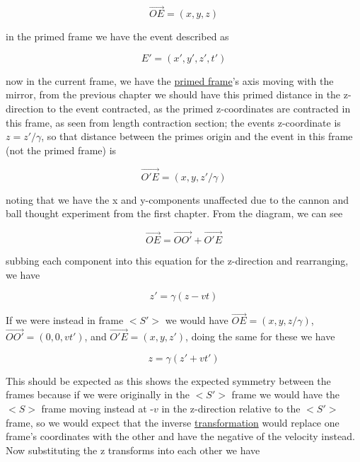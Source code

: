 \begin{equation}
	\vec{OE}=(x,y,z)
\end{equation}

in the primed frame we have the event described as

\begin{equation}
	E{'} = (x{'},y{'},z{'},t{'})
\end{equation}

now in the current frame, we have the \hyperlink{def-Primed-Frame}{primed frame}'s axis moving with the mirror, from the previous chapter we should have this primed distance in the z-direction to the event contracted, as the primed z-coordinates are contracted in this frame, as seen from length contraction section; the events z-coordinate is $z=z{'}/{\gamma}$, so that distance between the primes origin and the event in this frame (not the primed frame) is

\begin{equation}
	\vec{O{'}E} = (x,y,z{'}/{\gamma})
\end{equation}

noting that we have the x and y-components unaffected due to the cannon and ball thought experiment from the first chapter.
From the diagram, we can see

\begin{equation}
	\vec{OE}= \vec{OO{'}} + \vec{O{'}E}
	\label{eq: event}
\end{equation}

subbing each component into this equation for the z-direction and rearranging, we have

\begin{equation}
	z{'} = {\gamma} (z-vt)
\end{equation}

If we were instead in frame ${<\!\!S{'}\!\!>}$ we would have $\vec{OE}=(x,y,z/{\gamma})$, $\vec{OO{'}}=(0,0,vt{'})$, and $\vec{O{'}E} = (x,y,z{'})$, doing the same for these we have

\begin{equation}
	z = {\gamma} (z{'}+vt{'})
\end{equation}

This should be expected as this shows the expected symmetry between the frames because if we were originally in the ${<\!\!S{'}\!\!>}$ frame we would have the ${<\!\!S\!>}$ frame moving instead at -$v$ in the z-direction relative to the ${<\!\!S{'}\!\!>}$ frame, so we would expect that the inverse \hyperlink{def-transform}{transformation} would replace one frame's coordinates with the other and have the negative of the velocity instead.
Now substituting the z transforms into each other we have

